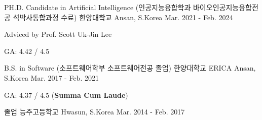 

\begin{cventries}

  \cventry
    {PH.D. Candidate in Artificial Intelligence (인공지능융합학과 바이오인공지능융합전공 석박사통합과정 수료)} %
    {한양대학교} %
    {Ansan, S.Korea} %
    {Mar. 2021 - Feb. 2024} %
    {
      \begin{cvitems} %
        \item {Adviced by Prof. Scott Uk-Jin Lee}
        \item {GA: 4.42 / 4.5}
      \end{cvitems}
    }

    \cventry
    {B.S. in Software (소프트웨어학부 소프트웨어전공 졸업)} %
    {한양대학교 ERICA} %
    {Ansan, S.Korea} %
    {Mar. 2017 - Feb. 2021} %
    {
      \begin{cvitems} %
        \item {GA: 4.37 / 4.5 (\textbf{Summa Cum Laude})} 
      \end{cvitems}
    }

    \cventry
    {졸업} %
    {능주고등학교} %
    {Hwasun, S.Korea} %
    {Mar. 2014 - Feb. 2017} %
    {}
\end{cventries}
